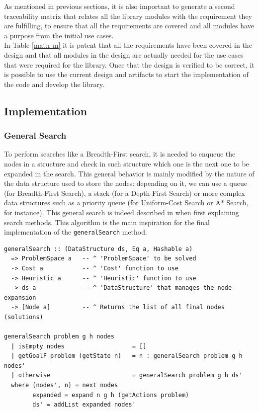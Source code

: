 As mentioned in previous sections, it is also important to generate a second
traceability matrix that relates all the library modules with the requirement
they are fulfilling, to ensure that all the requirements are covered and all
modules have a purpose from the initial use cases.\\

In Table \ref{mat:r-m} it is patent that all the requirements have been covered
in the design and that all modules in the design are actually needed for the
use cases that were required for the library. Once that the design is verified
to be correct, it is possible to use the current design and artifacts to start
the implementation of the code and develop the library.\\

\newpage

\subsection{Implementation}

\subsubsection{General Search}

To perform searches like a Breadth-First search, it is needed to enqueue the
nodes in a structure and check in such structure which one is the next one to
be expanded in the search. This general behavior is mainly modified by the
nature of the data structure used to store the nodes: depending on it, we can
use a queue (for Breadth-First Search), a stack (for a Depth-First Search) or
more complex data structures such as a priority queue (for Uniform-Cost Search
or A* Search, for instance). This general search is indeed described in
\cite{rusell-2003-aima} when first explaining search methods. This algorithm
is the main inspiration for the final implementation of the
\texttt{generalSearch} method.\\

\begin{lstlisting}[style=haskell,
caption=Pure \texttt{generalSearch} implementation, label=pure:general]
generalSearch :: (DataStructure ds, Eq a, Hashable a)
  => ProblemSpace a   -- ^ 'ProblemSpace' to be solved
  -> Cost a           -- ^ 'Cost' function to use
  -> Heuristic a      -- ^ 'Heuristic' function to use
  -> ds a             -- ^ 'DataStructure' that manages the node expansion
  -> [Node a]         -- ^ Returns the list of all final nodes (solutions)

generalSearch problem g h nodes
  | isEmpty nodes                   = []
  | getGoalF problem (getState n)   = n : generalSearch problem g h nodes'
  | otherwise                       = generalSearch problem g h ds'
  where (nodes', n) = next nodes
        expanded = expand n g h (getActions problem)
        ds' = addList expanded nodes'
\end{lstlisting}

